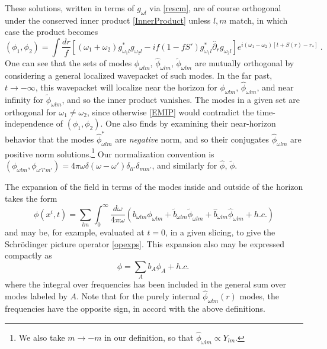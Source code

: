 \documentclass[12pt]{article}
\numberwithin{equation}{section}
\newcommand{\beq}{\begin{equation}}
\newcommand{\eeq}{\end{equation}}
\begin{document}
These solutions, written in terms of $g_{\omega l}$ via  
 \eqref{rescm}, are of course orthogonal under the conserved inner product \eqref{InnerProduct}
unless $l,m$ match, in which case the product becomes
\beq\label{EMIP}
(\phi_1,\phi_2)= \int \frac {dr}{f} \left[(\omega_1+\omega_2) g_{\omega_1l}^* g_{\omega_2l} - i f(1-fS') g_{\omega_1l}^* \overleftrightarrow{\partial_r} g_{\omega_2l} \right] e^{i(\omega_1-\omega_2)[t+S(r)-r_*]}\ .
\eeq
One can see that the sets of modes $\phi_{\omega lm}$, $\hat \phi_{\omega lm}$, $\tilde \phi_{\omega lm}$ are mutually orthogonal by considering a general localized wavepacket of such modes.  In the far past, $t\rightarrow-\infty$, this wavepacket will localize near the horizon for $\phi_{\omega lm}$, $\hat \phi_{\omega lm}$, and near infinity for $\tilde \phi_{\omega lm}$, and so the inner product vanishes.  The modes in a given set 
are orthogonal for $\omega_1\neq \omega_2$, since otherwise \eqref{EMIP}  would contradict the time-independence of $(\phi_1,\phi_2)$.  
One also finds by examining their near-horizon behavior that the modes $\hat \phi^*_{\omega lm}$ are {\it negative} norm, and so their conjugates $\hat \phi_{\omega lm}$ are  positive norm solutions.\footnote{We also take $m\rightarrow-m$ in our definition, so that $\hat \phi_{\omega l m} \propto Y_{lm}$.}  Our normalization convention is $(\phi_{\omega l m},\phi_{\omega' l' m'}) = 4\pi \omega \delta(\omega-\omega') \delta_{ll'}\delta_{mm'}$, and similarly for $\hat \phi$, $\tilde \phi$.  


The expansion of the field in terms of the modes  inside and outside of the horizon takes the form
\beq
\phi(x^i,t)= \sum_{lm}\int_0^\infty \frac{d\omega}{4\pi\omega}\left(b_{\omega l m} \phi_{\omega l m} + \tilde b_{\omega lm} \tilde\phi_{\omega l m} + \hat b_{\omega lm} \hat  \phi_{\omega l m} + h.c.\right)
\eeq
and may be, for example, evaluated at $t=0$, in a given slicing, to give the Schr\"odinger picture operator \eqref{opexps}.
This expansion also may be expressed compactly as
\beq\label{phiexp}
\phi= \sum_{A} b_A \phi_A + h.c.\ 
\eeq
where the integral over frequencies has been included in the general sum over modes labeled by $A$.
Note that for the purely internal $\hat \phi_{\omega lm}(r)$ modes, the frequencies have the opposite sign, in accord with the above definitions.   
\end{document}
